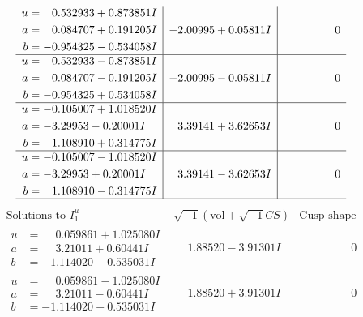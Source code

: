 \documentclass[1p]{elsarticle_modified}
\theoremstyle{definition}
\newcommand{\I}{\sqrt{-1}}
\begin{document}
$$\begin{array}{c|c|c}
\begin{aligned}
u &= \phantom{-}0.532933 + 0.873851 I \\
a &= \phantom{-}0.084707 + 0.191205 I \\
b &= -0.954325 - 0.534058 I\end{aligned}
 & -2.00995 + 0.05811 I & \phantom{-0.000000 } 0 \\ \hline\begin{aligned}
u &= \phantom{-}0.532933 - 0.873851 I \\
a &= \phantom{-}0.084707 - 0.191205 I \\
b &= -0.954325 + 0.534058 I\end{aligned}
 & -2.00995 - 0.05811 I & \phantom{-0.000000 } 0 \\ \hline\begin{aligned}
u &= -0.105007 + 1.018520 I \\
a &= -3.29953 - 0.20001 I \\
b &= \phantom{-}1.108910 + 0.314775 I\end{aligned}
 & \phantom{-}3.39141 + 3.62653 I & \phantom{-0.000000 } 0 \\ \hline\begin{aligned}
u &= -0.105007 - 1.018520 I \\
a &= -3.29953 + 0.20001 I \\
b &= \phantom{-}1.108910 - 0.314775 I\end{aligned}
 & \phantom{-}3.39141 - 3.62653 I & \phantom{-0.000000 } 0\\
 \hline 
 \end{array}$$\newpage$$\begin{array}{c|c|c}  
\text{Solutions to }I^u_{1}& \I (\text{vol} + \sqrt{-1}CS) & \text{Cusp shape}\\
 \hline 
\begin{aligned}
u &= \phantom{-}0.059861 + 1.025080 I \\
a &= \phantom{-}3.21011 + 0.60441 I \\
b &= -1.114020 + 0.535031 I\end{aligned}
 & \phantom{-}1.88520 - 3.91301 I & \phantom{-0.000000 } 0 \\ \hline\begin{aligned}
u &= \phantom{-}0.059861 - 1.025080 I \\
a &= \phantom{-}3.21011 - 0.60441 I \\
b &= -1.114020 - 0.535031 I\end{aligned}
 & \phantom{-}1.88520 + 3.91301 I & \phantom{-0.000000 } 0 \\ \hline\begin{aligned}

\end{aligned}
\end{array}$$
\end{document}
